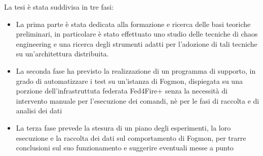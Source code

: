     
    La tesi è stata suddivisa in tre fasi: 
    \begin{itemize}
        \item La prima parte è stata dedicata alla formazione e ricerca delle basi teoriche preliminari, in particolare è stato effettuato uno studio delle tecniche di chaos engineering e una ricerca degli strumenti adatti per l’adozione di tali tecniche su un’architettura distribuita.
        \item La seconda fase ha previsto la realizzazione di un programma di supporto, in grado di automatizzare i test su un’istanza di Fogmon, dispiegata su una porzione dell'infrastruttuta federata Fed4Fire+ \cite{Fed4Fire+} senza la necessità di intervento manuale per l'esecuzione dei comandi, nè per le fasi di raccolta e di analisi dei dati 
        \item La terza fase prevede la stesura di un piano degli esperimenti, la loro esecuzione e la raccolta dei dati sul comportamento di Fogmon, per trarre conclusioni sul suo funzionamento e suggerire eventuali messe a punto 
    \end{itemize}
